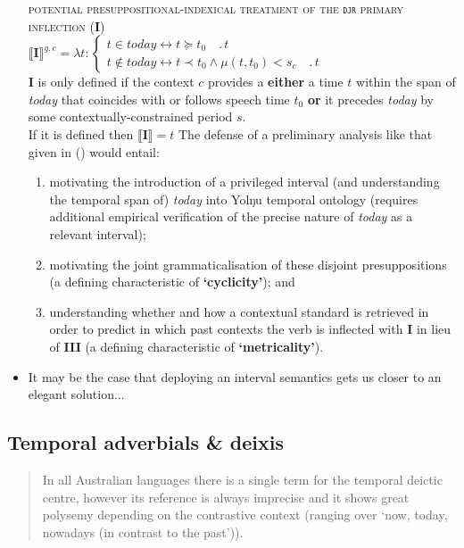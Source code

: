 \documentclass[11pt]{article}
\begin{document}
\begin{itemize}
\pex\textsc{potential presuppositional-indexical treatment of the \texttt{djr} primary inflection (\textbf{I})}\\
$\llbracket\textbf{I}\rrbracket^{g,c}=\lambda t:\begin{cases}t\in today\leftrightarrow t\succcurlyeq t_0\quad.\,t\\
t\notin today \leftrightarrow t\prec t_0\wedge\mu(t,t_0)<s_c\quad.\,t
\end{cases}$\\
\textbf{I} is only defined if the context $c$ provides a \textbf{either} a time $t$ within the span of \textit{today} that coincides with or follows speech time $t_0$ \textbf{or} it precedes \textit{today} by some contextually-constrained period $s$.\\
If it is defined then $\llbracket\textbf{I}\rrbracket=t$
\xe
The defense of a preliminary analysis like that given in (\lastx) would entail:
\begin{enumerate}%
	\item motivating the introduction of a privileged interval (and understanding the temporal span of) \textit{today} into Yolŋu temporal ontology (requires additional empirical verification of the precise nature of \textit{today} as a relevant interval);
	\item motivating the joint grammaticalisation of these disjoint presuppositions (a defining characteristic of \textbf{`cyclicity'}); and
	\item understanding whether and how a contextual standard is retrieved in order to predict in which past contexts the verb is inflected with \textbf{I} in lieu of \textbf{III} (a defining characteristic of \textbf{`metricality'}).
\end{enumerate}


\item It may be the case that deploying an interval semantics gets us closer to an elegant solution...

\end{itemize}


\subsection*{Temporal adverbials \& deixis}


\begin{quote}
\small	In all Australian languages there is a single term for the temporal deictic centre, however its reference is always imprecise and it shows great polysemy depending on the contrastive context (ranging over ‘now, today, nowadays (in contrast to the past’)).\\\hspace*{\fill}\citep[147]{Austin1998}
\end{quote}
\end{document}
